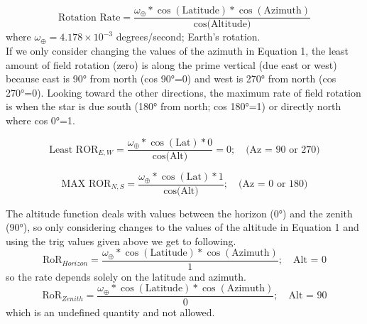 \documentclass[a4paper,12pt]{extarticle}
\begin{document}
\begin{equation}
	\text{Rotation Rate}= \frac{\omega_\oplus \ast \cos(\text{Latitude}) \ast \cos(\text{Azimuth})}{\cos\text{(Altitude)}}
\end{equation}
where $\omega_\oplus=4.178 \times 10^{-3}$ degrees/second; Earth’s rotation. \\

If we only consider changing the values of the
azimuth in Equation 1, the least amount of field rotation (zero) is along the prime vertical (due east or west) because east is 90° from north (cos 90°=0) and west is 270° from north (cos 270°=0). Looking toward the other directions, the maximum rate of field rotation is when the star is due south (180° from north; cos 180°=1) or directly north where cos 0°=1.

$$\text{Least ROR}_{E,W}= \frac{\omega_\oplus \ast \cos(\text{Lat}) \ast 0}{\cos\text{(Alt)}}=0;\quad \text{(Az = 90 or 270)}$$


$$	\text{MAX ROR}_{N,S}= \frac{\omega_\oplus \ast \cos(\text{Lat}) \ast 1}{\cos\text{(Alt)}};\quad \text{(Az = 0 or 180)}$$

The altitude function deals with values between
the horizon (0°) and the zenith (90°), so only considering changes to the values of the altitude in Equation 1 and using the trig values given above we get to following.
$$	\text{RoR}_{Horizon}= \frac{\omega_\oplus \ast \cos(\text{Latitude}) \ast \cos(\text{Azimuth})}{1}; \quad \text{Alt = 0}$$
so the rate depends solely on the latitude and azimuth.
$$	\text{RoR}_{Zenith}= \frac{\omega_\oplus \ast \cos(\text{Latitude}) \ast \cos(\text{Azimuth})}{0}; \quad \text{Alt = 90}$$
which is an undefined quantity and not allowed.
\end{document}
